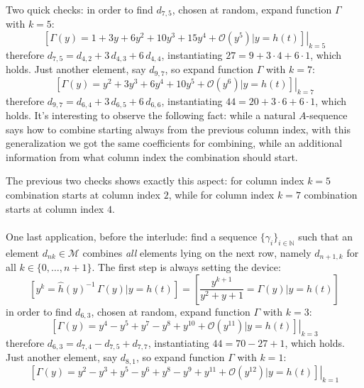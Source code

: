 Two quick checks: in order to find $d_{7,5}$, chosen at random, 
expand function $\Gamma$ with $k=5$:
\begin{displaymath}
    \left.\left[\Gamma(y)=1 + 3y + 6y^2 + 10y^3 + 15y^4 + \mathcal{O}(y^5) 
        \big| y = h(t) \right]\right|_{k=5}
\end{displaymath}
therefore $d_{7,5}=d_{4,2} + 3\,d_{4,3} + 6\,d_{4,4}$, 
instantiating $27 = 9 + 3\cdot4 + 6\cdot1$, which holds.
Just another element, say $d_{9,7}$, so expand function $\Gamma$ with $k=7$:
\begin{displaymath}
    \left.\left[\Gamma(y)=y^2 + 3y^3 + 6y^4 + 10y^5 +  \mathcal{O}(y^6) 
        \big| y = h(t) \right]\right|_{k=7}
\end{displaymath}
therefore $d_{9,7}=d_{6,4} + 3\,d_{6,5} + 6\,d_{6,6}$, 
instantiating $44 = 20 + 3\cdot6 + 6\cdot1$, which holds.
It's interesting to observe the following fact: while a natural $A$-sequence
says how to combine starting always from the previous column index, with
this generalization we got the same coefficients for combining, while
an additional information from what column index the combination should start.

The previous two checks shows exactly this aspect: for column index $k=5$
combination starts at column index $2$, while for column index $k=7$ combination
starts at column index $4$.
\\\\
One last application, before the interlude: 
find a sequence $\lbrace \gamma_{i} \rbrace_{i\in\mathbb{N}}$ such that 
an element $d_{nk}\in\mathcal{M}$ combines \emph{all} elements lying on 
the next row, namely $d_{n+1,k}$ for all $k\in\lbrace0,\ldots,n+1\rbrace$.
The first step is always setting the device:
\begin{displaymath}
    \left[y^{k} = \hat{h}(y)^{-1}\,\Gamma(y) \big| y = h(t) \right]=
        \left[ \frac{y^{k + 1}}{y^2 + y + 1} = \Gamma(y) \big| y = h(t) \right]
\end{displaymath}
in order to find $d_{6,3}$, chosen at random, expand function $\Gamma$ with $k=3$:
\begin{displaymath}
    \left.\left[\Gamma(y)=y^4 -y^5 + y^7 -y^8 +y^{10} + \mathcal{O}(y^{11}) 
        \big| y = h(t) \right]\right|_{k=3}
\end{displaymath}
therefore $d_{6,3}=d_{7,4} - d_{7,5} + d_{7,7}$, instantiating $44 = 70 -27 +1$, 
which holds. Just another element, say $d_{8,1}$, so expand function 
$\Gamma$ with $k=1$:
\begin{displaymath}
    \left.\left[\Gamma(y)=y^2 -y^3 + y^5 -y^6 + y^8 -y^9 + y^{11} + 
        \mathcal{O}(y^{12}) \big| y = h(t) \right]\right|_{k=1}
\end{displaymath}

